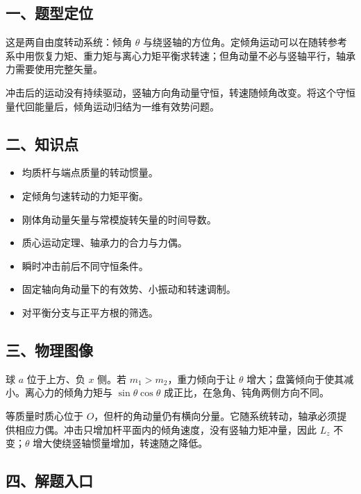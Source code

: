 \documentclass[12pt,a4paper,fontset=fandol]{ctexart}
\providecommand{\tightlist}{\setlength{\itemsep}{0pt}\setlength{\parskip}{0pt}}
\begin{document}
\subsection{一、题型定位}\label{ux4e00ux9898ux578bux5b9aux4f4d-5}

这是两自由度转动系统：倾角 \(\theta\)
与绕竖轴的方位角。定倾角运动可以在随转参考系中用恢复力矩、重力矩与离心力矩平衡求转速；但角动量不必与竖轴平行，轴承力需要使用完整矢量。

冲击后的运动没有持续驱动，竖轴方向角动量守恒，转速随倾角改变。将这个守恒量代回能量后，倾角运动归结为一维有效势问题。

\subsection{二、知识点}\label{ux4e8cux77e5ux8bc6ux70b9-5}

\begin{itemize}
\tightlist
\item
  均质杆与端点质量的转动惯量。
\item
  定倾角匀速转动的力矩平衡。
\item
  刚体角动量矢量与常模旋转矢量的时间导数。
\item
  质心运动定理、轴承力的合力与力偶。
\item
  瞬时冲击前后不同守恒条件。
\item
  固定轴向角动量下的有效势、小振动和转速调制。
\item
  对平衡分支与正平方根的筛选。
\end{itemize}

\subsection{三、物理图像}\label{ux4e09ux7269ux7406ux56feux50cf-5}

球 \(a\) 位于上方、负 \(x\) 侧。若 \(m_1>m_2\)，重力倾向于让 \(\theta\)
增大；盘簧倾向于使其减小。离心力的倾角力矩与 \(\sin\theta\cos\theta\)
成正比，在急角、钝角两侧方向不同。

等质量时质心位于
\(O\)，但杆的角动量仍有横向分量。它随系统转动，轴承必须提供相应力偶。冲击只增加杆平面内的倾角速度，没有竖轴力矩冲量，因此
\(L_z\) 不变；\(\theta\) 增大使绕竖轴惯量增加，转速随之降低。

\subsection{四、解题入口}\label{ux56dbux89e3ux9898ux5165ux53e3-5}
\end{document}
